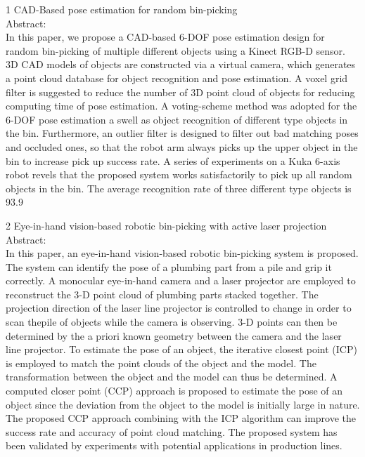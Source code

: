 \documentclass[10]{article}
\begin{document}
1
CAD-Based pose estimation for random bin-picking\\
Abstract:\\
In this paper, we propose a CAD-based 6-DOF pose estimation design for random bin-picking of multiple different objects using a Kinect RGB-D sensor. 3D CAD models of objects are constructed via a virtual camera, which generates a point cloud database for object recognition and pose estimation. A voxel grid filter is suggested to reduce the number of 3D point cloud of objects for reducing computing time of pose estimation. A voting-scheme method was adopted for the 6-DOF pose estimation a swell as object recognition of different type objects in the bin. Furthermore, an outlier filter is designed to filter out bad matching poses and occluded ones, so that the robot arm always picks up the upper object in the bin to increase pick up success rate. A series of experiments on a Kuka 6-axis robot revels that the proposed system works satisfactorily to pick up all random objects in the bin. The average recognition rate of three different type objects is 93.9%

2
Eye-in-hand vision-based robotic bin-picking with active laser projection\\
Abstract:\\
 In this paper, an eye-in-hand vision-based robotic bin-picking system is proposed. The system can identify the pose of a plumbing part from a pile and grip it correctly. A monocular eye-in-hand camera and a laser projector are employed to reconstruct the 3-D point cloud of plumbing parts stacked together. The projection direction of the laser line projector is controlled to change in order to scan thepile of objects while the camera is observing. 3-D points can then be determined by the a priori known geometry between the camera and the laser line projector. To estimate the pose of an object, the iterative closest point (ICP) is employed to match the point clouds of the object and the model. The transformation between the object and the model can thus be determined. A computed closer point (CCP) approach is proposed to estimate the pose of an object since the deviation from the object to the model is initially large in nature. The proposed CCP approach combining with the ICP algorithm can improve the success rate and accuracy of point cloud matching. The proposed system has been validated by experiments with potential applications in production lines.
\end{document}
